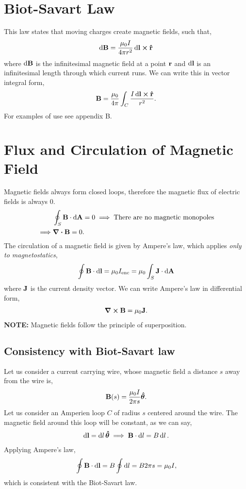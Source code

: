 \documentclass{book}
\begin{document}
\section{Biot-Savart Law}
This law states that moving charges create magnetic fields, such that,
\begin{equation}
    \dd{\vb{B}} = \frac{\mu_0I}{4\pi r^2}\dd{\vb{l}}\cross\vu{r}
\end{equation}
where $\dd{\vb{B}}$ is the infinitesimal magnetic field at a point $\vb{r}$ and $\dd{\vb{l}}$ is an infinitesimal length through which current runs. We can write this in vector integral form,
\begin{equation}
    \vb{B} = \frac{\mu_0}{4\pi}\int_C \frac{I\dd{\vb{l}}\cross\vu{r}}{r^2}.
\end{equation}
For examples of use see appendix B.
\section{Flux and Circulation of Magnetic Field}
Magnetic fields always form closed loops, therefore the magnetic flux of electric fields is always 0. 
\begin{align}
    &\oint_S \vb{B}\cdot\dd{\vb{A}} = 0 \implies \text{There are no magnetic monopoles} \\
    \implies & \div{\vb{B}} = 0.
\end{align}
The circulation of a magnetic field is given by Ampere's law, which applies \textit{only to magnetostatics},
\begin{equation}
    \oint \vb{B}\cdot \dd{\vb{l}} = \mu_0 I_{\text{enc}} = \mu_0\int_S \vb{J}\cdot\dd{\vb{A}}
\end{equation}
where $\vb{J}$ is the current density vector. We can write Ampere's law in differential form,
\begin{equation}
    \curl{\vb{B}} = \mu_0\vb{J}.
\end{equation}
\textbf{NOTE:} Magnetic fields follow the principle of superposition.
\subsection{Consistency with Biot-Savart law}
Let us consider a current carrying wire, whose magnetic field a distance $s$ away from the wire is,
\begin{equation}
    \vb{B}(s) = \frac{\mu_0 I}{2\pi s}\vu*{\theta}.
\end{equation}
Let us consider an Amperien loop $C$ of radius $s$ centered around the wire. The magnetic field around this loop will be constant, as we can say,
\begin{equation}
    \dd{\vb{l}} = \dd{l}\vu*{\theta} \implies \vb{B}\cdot\dd{l} = B\dd{l}.
\end{equation}
Applying Ampere's law,
\begin{equation}
    \oint \vb{B}\cdot\dd{\vb{l}} = B\oint\dd{l} = B 2\pi s = \mu_0 I,
\end{equation}
which is consistent with the Biot-Savart law.
\newpage
\end{document}
